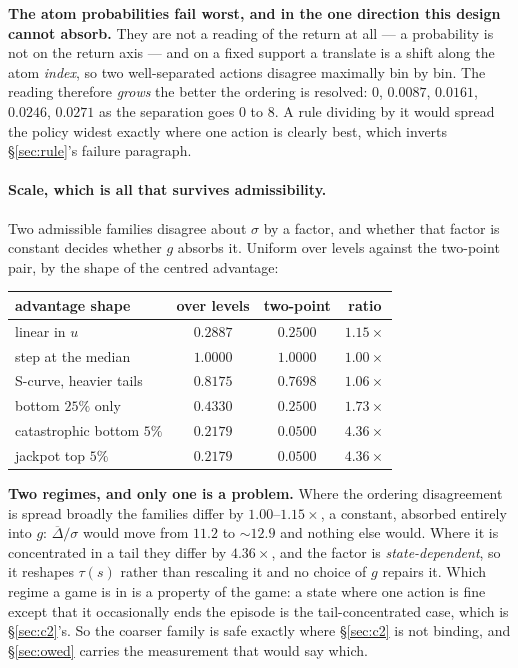 \documentclass{article}
\newcommand{\gapbar}{\overline{\Delta}}
\newcommand{\srank}{\sigma}
\begin{document}
\textbf{The atom probabilities fail worst, and in the one direction this design cannot absorb.}
They are not a reading of the return at all --- a probability is not on the return axis --- and
on a fixed support a translate is a shift along the atom \emph{index}, so two well-separated
actions disagree maximally bin by bin. The reading therefore \emph{grows} the better the ordering
is resolved: $0$, $0.0087$, $0.0161$, $0.0246$, $0.0271$ as the separation goes $0$ to $8$. A
rule dividing by it would spread the policy widest exactly where one action is clearly best,
which inverts \S\ref{sec:rule}'s failure paragraph.

\paragraph{Scale, which is all that survives admissibility.} Two admissible families disagree
about $\srank$ by a factor, and whether that factor is constant decides whether $g$ absorbs it.
Uniform over levels against the two-point pair, by the shape of the centred advantage:

\begin{center}
\small
\begin{tabular}{lccc}
  \toprule
  advantage shape & over levels & two-point & ratio \\
  \midrule
  linear in $u$            & $0.2887$ & $0.2500$ & $1.15\times$ \\
  step at the median       & $1.0000$ & $1.0000$ & $1.00\times$ \\
  S-curve, heavier tails   & $0.8175$ & $0.7698$ & $1.06\times$ \\
  bottom $25\%$ only       & $0.4330$ & $0.2500$ & $1.73\times$ \\
  catastrophic bottom $5\%$& $0.2179$ & $0.0500$ & $\bm{4.36\times}$ \\
  jackpot top $5\%$        & $0.2179$ & $0.0500$ & $\bm{4.36\times}$ \\
  \bottomrule
\end{tabular}
\end{center}

\textbf{Two regimes, and only one is a problem.} Where the ordering disagreement is spread
broadly the families differ by $1.00$--$1.15\times$, a constant, absorbed entirely into $g$:
$\gapbar/\srank$ would move from $11.2$ to ${\sim}12.9$ and nothing else would. Where it is
concentrated in a tail they differ by $4.36\times$, and the factor is \emph{state-dependent}, so
it reshapes $\tau(s)$ rather than rescaling it and no choice of $g$ repairs it. Which regime a
game is in is a property of the game: a state where one action is fine except that it
occasionally ends the episode is the tail-concentrated case, which is \S\ref{sec:c2}'s. So the
coarser family is safe exactly where \S\ref{sec:c2} is not binding, and \S\ref{sec:owed} carries
the measurement that would say which.
\end{document}
